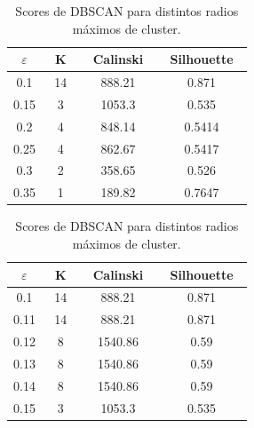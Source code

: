\documentclass[oneside]{book}
\begin{document}
\begin{table}[H]
  \centering
\begin{tabular}{|c|ccc|}
  \hline
   ~\hspace{2mm}$\varepsilon$\hspace{2mm}~ & ~\hspace{2mm}K\hspace{2mm}~ & ~\hspace{2mm}Calinski\hspace{2mm}~ & ~\hspace{2mm}Silhouette\hspace{2mm}~ \\ \hline
0.1 & 14 & 888.21 & 0.871 \\ \hline
0.15 & 3 & 1053.3 & 0.535 \\ \hline
0.2 & 4 & 848.14 & 0.5414 \\ \hline
0.25 & 4 & 862.67 & 0.5417 \\ \hline
0.3 & 2 & 358.65 & 0.526 \\ \hline
0.35 & 1 & 189.82 & 0.7647 \\ \hline
\end{tabular}
\quad
\begin{tabular}{|c|ccc|}
  \hline
   ~\hspace{2mm}$\varepsilon$\hspace{2mm}~ & ~\hspace{2mm}K\hspace{2mm}~ & ~\hspace{2mm}Calinski\hspace{2mm}~ & ~\hspace{2mm}Silhouette\hspace{2mm}~ \\ \hline
0.1 & 14 & 888.21 & 0.871 \\ \hline
0.11 & 14 & 888.21 & 0.871 \\ \hline
0.12 & 8 & 1540.86 & 0.59 \\ \hline
0.13 & 8 & 1540.86 & 0.59 \\ \hline
0.14 & 8 & 1540.86 & 0.59 \\ \hline
0.15 & 3 & 1053.3 & 0.535 \\ \hline
\end{tabular}
\caption{Scores de DBSCAN para distintos radios máximos de cluster.}
\label{tab:dbscan1}
\end{table}
\end{document}

